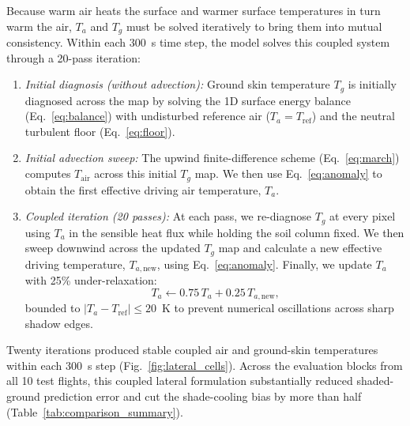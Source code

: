 \documentclass[12pt]{article}
\begin{document}
Because warm air heats the surface and warmer surface temperatures in turn warm the air, $T_a$ and $T_g$ must be solved iteratively to bring them into mutual consistency. Within each $300$~s time step, the model solves this coupled system through a 20-pass iteration:
\begin{enumerate}[label=(\arabic*), leftmargin=2em, itemsep=0.2ex]
\item \textit{Initial diagnosis (without advection):} Ground skin temperature $T_g$ is initially diagnosed across the map by solving the 1D surface energy balance (Eq.~\ref{eq:balance}) with undisturbed reference air ($T_a = T_{\textrm{ref}}$) and the neutral turbulent floor (Eq.~\ref{eq:floor}).
\item \textit{Initial advection sweep:} The upwind finite-difference scheme (Eq.~\ref{eq:march}) computes $T_{\textrm{air}}$ across this initial $T_g$ map. We then use Eq.~\ref{eq:anomaly} to obtain the first effective driving air temperature, $T_a$.
\item \textit{Coupled iteration (20 passes):} At each pass, we re-diagnose $T_g$ at every pixel using $T_a$ in the sensible heat flux while holding the soil column fixed. We then sweep downwind across the updated $T_g$ map and calculate a new effective driving temperature, $T_{a,\mathrm{new}}$, using Eq.~\ref{eq:anomaly}. Finally, we update $T_a$ with 25\% under-relaxation:
\begin{equation} \label{eq:relax}
T_a \leftarrow 0.75 \, T_a + 0.25 \, T_{a,\mathrm{new}}\textrm{,}
\end{equation}
bounded to $|T_a - T_{\textrm{ref}}| \le 20$~K to prevent numerical oscillations across sharp shadow edges.
\end{enumerate}
Twenty iterations produced stable coupled air and ground-skin temperatures within each $300$~s step (Fig.~\ref{fig:lateral_cells}). Across the evaluation blocks from all 10 test flights, this coupled lateral formulation substantially reduced shaded-ground prediction error and cut the shade-cooling bias by more than half (Table~\ref{tab:comparison_summary}).
\end{document}
